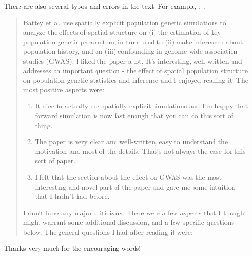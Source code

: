 

\begin{point}{}
    There are also several typos and errors in the text. For example, \revref; .
\end{point}






\begin{quote}
    Battey et al. use spatially explicit population genetic simulations to
    analyze the effects of spatial structure on (i) the estimation of key
    population genetic parameters, in turn used to (ii) make inferences about
    population history, and on (iii) confounding in genome-wide association
    studies (GWAS). I liked the paper a lot. It's interesting, well-written and
    addresses an important question - the effect of spatial population
    structure on population genetic statistics and inference-and I enjoyed
    reading it. The most positive aspects were:

    \begin{enumerate}
        \item It nice to actually see spatially explicit simulations and I'm happy that forward simulation is now fast enough that you can do this sort of thing.
        \item The paper is very clear and well-written, easy to understand the motivation and most of the details. That's not always the case for this sort of paper.
        \item I felt that the section about the effect on GWAS was the most interesting and novel part of the paper and gave me some intuition that I hadn't had before.
    \end{enumerate}

    I don't have any major criticisms. There were a few aspects that I thought might warrant some additional discussion, and a few specific questions below. The general questions I had after reading it were:
\end{quote}

Thanks very much for the encouraging words!

